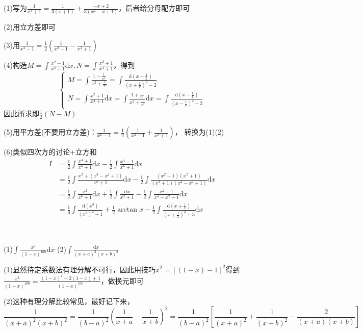 \begin{solution}
  (1)写为$\frac{1}{x^3 + 1} = \frac{1}{3(x+1)} + \frac{-x + 2}{3(x^2 - x + 1)}$，后者给分母配方即可

  (2)用立方差即可

  (3)用$\frac{1}{x^4 - 1} = \frac{1}{2} \left( \frac{1}{x^2 - 1} - \frac{1}{x^2 + 1} \right)$

  (4)构造$M = \int \frac{x^2 - 1}{x^4 + 1}\mathrm{d} x, N =\int \frac{x^2 + 1}{x^4 + 1}$，得到
  \begin{equation*}
    \begin{cases}
      M = \int \frac{1 - \frac{1}{x^2}}{x^2 + \frac{1}{x^2}} =  \int \frac{\mathrm{d}(x + \frac{1}{x})}{(x + \frac{1}{x})^2 - 2}\\ 
      N = \int \frac{x^2 + 1}{x^4 + 1} \mathrm{d} x= \int \frac{1 + \frac{1}{x^2}}{x^2 + \frac{1}{x^2}}\mathrm{d} x = \int \frac{\mathrm{d}(x - \frac{1}{x})}{(x-\frac{1}{x})^2 + 2}
    \end{cases}
  \end{equation*}
  因此所求即$\frac{1}{2}(N - M)$

  (5)用平方差(不要用立方差)：$\frac{1}{x^6 - 1} = \frac{1}{2}(\frac{1}{x^3 - 1} + \frac{1}{x^3 + 1})$，
  转换为(1)(2)

  (6)类似四次方的讨论+立方和
  \begin{align*}
    I &= \frac{1}{2}\int \frac{x^4 + 1}{x^6 + 1}\mathrm{d} x - \frac{1}{2} \int \frac{x^4 - 1}{x^6 + 1}\mathrm{d} x\\
    &= \frac{1}{2} \int \frac{x^2 + (x^4 - x^2 + 1)}{x^6 + 1}\mathrm{d} x - \frac{1}{2} \int \frac{(x^2 - 1)(x^2 + 1)}{(x^2 + 1)(x^4 - x^2 + 1)}\mathrm{d} x\\
    &= \frac{1}{2} \int \frac{x^2}{x^6 + 1}\mathrm{d} x + \frac{1}{2}\int \frac{\mathrm{d} x}{x^2 + 1} - \frac{1}{2} \int \frac{x^2 - 1}{x^{4 }- x^2 + 1}\mathrm{d} x\\
    &= \frac{1}{6}\int \frac{\mathrm{d}(x^3)}{(x^3)^2 + 1} + \frac{1}{2} \arctan x - \frac{1}{2} \int \frac{\mathrm{d}(x + \frac{1}{x})}{(x + \frac{1}{x})^2 + 3}\mathrm{d} x
  \end{align*}
\end{solution}

~

\begin{exercise}[几个经典题]
  (1)$\int \frac{x^2}{(1 - x)^{100}}\mathrm{d} x$
  (2)$\int \frac{\mathrm{d} x}{(x+a)^2 (x + b)^2}$
\end{exercise}

\begin{solution}
  (1)显然待定系数法有理分解不可行，因此用技巧$x^2 = [(1-x) - 1]^2$得到$\frac{x^2}{(1-x)^{100}} = \frac{(1-x)^2 - 2(1-x) + 1}{(1-x)^{100}}$，做换元即可

  (2)这种有理分解比较常见，最好记下来，
  \begin{equation*}
    \frac{1}{(x+a)^2(x+b)^2} = \frac{1}{(b-a)^2} \left( \frac{1}{x+a} - \frac{1}{x+b} \right)^2 = \frac{1}{(b-a)^2} \left[ \frac{1}{(x+a)^2} + \frac{1}{(x+b)^2} - \frac{2}{(x+a)(x+b)} \right]
  \end{equation*}
\end{solution}

